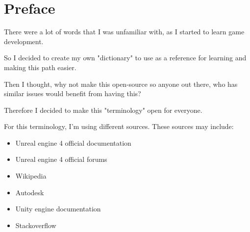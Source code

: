\section{Preface}

There were a lot of words that I was unfamiliar with, as I started to learn game development.

So I decided to create my own "dictionary" to use as a reference for
learning and making this path easier.

Then I thought, why not make this open-source so anyone out there, who
has similar issues would benefit from having this?

Therefore I decided to make this "terminology" open for everyone.

For this terminology, I'm using different sources. These sources may include:

\begin{itemize}
	\item Unreal engine 4 official documentation
	\item Unreal engine 4 official forums
	\item Wikipedia
	\item Autodesk
	\item Unity engine documentation
	\item Stackoverflow
\end{itemize}